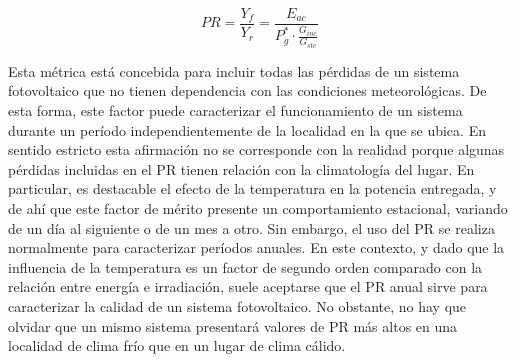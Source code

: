 \begin{equation}
  \label{eq:PR}
  PR = \frac{Y_f}{Y_r} = \frac{E_{ac}}{P_g^* \cdot \frac{G_{inc}}{G_{stc}}}
\end{equation}

Esta métrica está concebida para incluir todas las pérdidas de un sistema fotovoltaico que no tienen dependencia con las condiciones meteorológicas. De esta forma, este
factor puede caracterizar el funcionamiento de un sistema durante un período
independientemente de la localidad en la que se ubica. En sentido
estricto esta afirmación no se corresponde con la realidad porque
algunas pérdidas incluidas en el PR tienen relación con la
climatología del lugar. En particular, es destacable el efecto de la
temperatura en la potencia entregada, y de ahí que este factor de
mérito presente un comportamiento estacional, variando de un día al siguiente o de un mes a otro.  Sin embargo, el uso del PR se realiza normalmente para caracterizar
períodos anuales. En este contexto, y dado que la influencia de la
temperatura es un factor de segundo orden comparado con la relación entre
energía e irradiación, suele aceptarse que el PR anual sirve para
caracterizar la calidad de un sistema fotovoltaico. No obstante, no hay que olvidar que un mismo sistema presentará valores de PR más altos en una localidad de clima frío que en un lugar de clima cálido.

